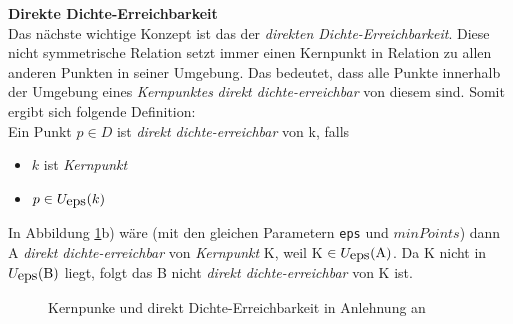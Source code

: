 \documentclass{lni}
\begin{document}
\begin{minipage}{\textwidth}
\textbf{Direkte Dichte-Erreichbarkeit}\\
Das nächste wichtige Konzept ist das der \textit{direkten Dichte-Erreichbarkeit}. Diese nicht symmetrische Relation setzt immer einen Kernpunkt in Relation zu allen anderen Punkten in seiner Umgebung. Das bedeutet, dass alle Punkte innerhalb der Umgebung eines \textit{Kernpunktes} \textit{direkt dichte-erreichbar} von diesem sind. Somit ergibt sich folgende Definition:\\
Ein Punkt $ p \in D $ ist \textit{direkt dichte-erreichbar} von k, falls
\begin{itemize}
    \item $k$ ist \textit{Kernpunkt}
    \item $ p \in U_{\lstinline{eps}}(k) $
\end{itemize}
In Abbildung \ref{fig:1}b) wäre (mit den gleichen Parametern \lstinline{eps} und $minPoints$) dann A \textit{direkt dichte-erreichbar} von \textit{Kernpunkt} K, weil K $\in U_{\lstinline{eps}}(\text{A})$. Da K nicht in $U_{\lstinline{eps}}(\text{B})$ liegt, folgt das B nicht \textit{direkt dichte-erreichbar} von K ist.


\begin{figure}[H]
    \centering
    \subfloat[]{{}}%
    \qquad
    \subfloat[]{{}}
    \caption{Kernpunke und direkt Dichte-Erreichbarkeit in Anlehnung an \cite{SKRIPT}}%
    \label{fig:1}%
\end{figure}

\end{minipage}

\end{document}
